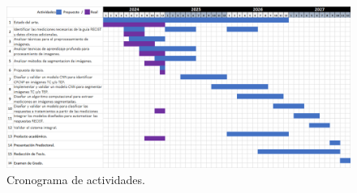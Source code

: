 \documentclass[11pt,a4paper,openany]{article}
\begin{document}
\newpage
\begin{landscape}

    \begin{figure}[H]
        \centering
        \includegraphics[width=15 cm]{cronograma.png}
        \caption {Cronograma de actividades.\label{fig:Cronograma}}
    \end{figure}
\end{landscape}
\newpage


\end{document}
